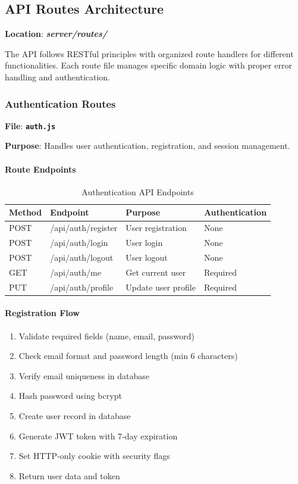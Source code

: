 \documentclass[12pt,a4paper]{article}
\newcommand{\file}[1]{\textbf{\texttt{#1}}}
\newcommand{\folder}[1]{\textbf{\textit{#1}}}
\begin{document}
\subsection{API Routes Architecture}
\label{subsec:api-routes}

\textbf{Location}: \folder{server/routes/}

The API follows RESTful principles with organized route handlers for different functionalities. Each route file manages specific domain logic with proper error handling and authentication.

\subsubsection{Authentication Routes}
\label{subsubsec:auth-routes}

\textbf{File}: \file{auth.js}

\textbf{Purpose}: Handles user authentication, registration, and session management.

\paragraph{Route Endpoints}
\begin{table}[H]
\centering
\small
\begin{tabular}{@{}llll@{}}
\toprule
\textbf{Method} & \textbf{Endpoint} & \textbf{Purpose} & \textbf{Authentication} \\
\midrule
POST & /api/auth/register & User registration & None \\
POST & /api/auth/login & User login & None \\
POST & /api/auth/logout & User logout & None \\
GET & /api/auth/me & Get current user & Required \\
PUT & /api/auth/profile & Update user profile & Required \\
\bottomrule
\end{tabular}
\caption{Authentication API Endpoints}
\label{tab:auth-endpoints}
\end{table}

\paragraph{Registration Flow}
\begin{enumerate}
\item Validate required fields (name, email, password)
\item Check email format and password length (min 6 characters)
\item Verify email uniqueness in database
\item Hash password using bcrypt
\item Create user record in database
\item Generate JWT token with 7-day expiration
\item Set HTTP-only cookie with security flags
\item Return user data and token
\end{enumerate}
\end{document}
